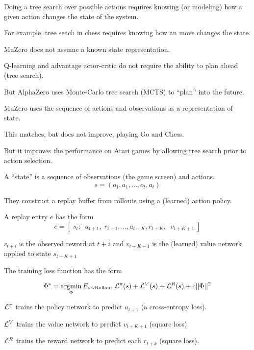 {\vfill
Doing a tree search over possible actions requires knowing (or modeling) how a given action changes the state of the system.

\vfill
For example, tree seach in chess requires knowing how an move changes the state.

\vfill
MuZero does not assume a known state representation.


Q-learning and advantage actor-critic do not require the ability to plan ahead (tree search).

\vfill
But AlphaZero uses Monte-Carlo tree search (MCTS) to ``plan'' into the future.

\vfill
MuZero uses the sequence of actions and observations as a representation of state.

\vfill
This matches, but does not improve, playing Go and Chess.

\vfill
But it improves the performance on Atari games by allowing tree search prior to action selection.


A ``state'' is a sequence of observations (the game screen) and actions.
$$s = (o_1,a_1,\ldots,o_t,a_t)$$

\vfill
They construct a replay buffer from rollouts using a (learned) action policy.

\vfill
A replay entry $e$ has the form
$$e = \left[\;s_t;\;\;a_{t+1},\;r_{t+1},\ldots,a_{t+K},r_{t+K},\;\;v_{t+K+1}\;\right]$$

\vfill
$r_{t+i}$ is the observed reword at $t+i$ and $v_{t+K+1}$ is the (learned) value network applied to state $s_{t+K+1}$


{\huge
The training loss function has the form

$$\Phi^* = \operatorname*{argmin}_\Phi E_{s \sim \mathrm{Rollout}}\;{\cal L}^\pi(s) + {\cal L}^V(s) +{\cal L}^R(s) + c||\Phi||^2$$
  
\vfill
${\cal L}^\pi$ trains the policy network to predict $a_{t+1}$ (a cross-entropy loss).

\vfill
${\cal L}^V$ trains the value network to predict $v_{t+K+1}$ (square loss).

\vfill
${\cal L}^R$ trains the reward network to predict each $r_{t+k}$ (square loss).
}

}
